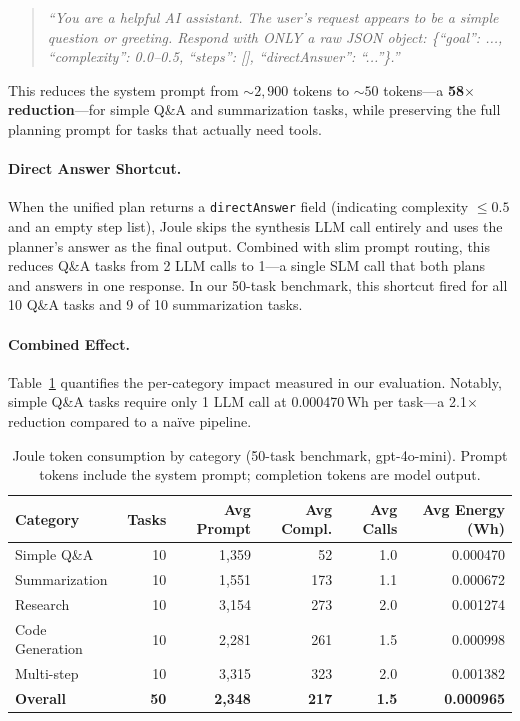 \begin{quote}
\small
\textit{``You are a helpful AI assistant. The user's request appears to be a simple question or greeting. Respond with ONLY a raw JSON object: \{``goal'': ..., ``complexity'': 0.0--0.5, ``steps'': [], ``directAnswer'': ``...''\}.''}
\end{quote}

\noindent This reduces the system prompt from ${\sim}2{,}900$ tokens to ${\sim}50$ tokens---a \textbf{58$\times$ reduction}---for simple Q\&A and summarization tasks, while preserving the full planning prompt for tasks that actually need tools.

\paragraph{Direct Answer Shortcut.}
When the unified plan returns a \texttt{directAnswer} field (indicating complexity $\leq 0.5$ and an empty step list), Joule skips the synthesis LLM call entirely and uses the planner's answer as the final output. Combined with slim prompt routing, this reduces Q\&A tasks from 2 LLM calls to 1---a single SLM call that both plans and answers in one response. In our 50-task benchmark, this shortcut fired for all 10 Q\&A tasks and 9 of 10 summarization tasks.

\paragraph{Combined Effect.}
Table~\ref{tab:prompt-savings} quantifies the per-category impact measured in our evaluation. Notably, simple Q\&A tasks require only 1 LLM call at 0.000470\,Wh per task---a 2.1$\times$ reduction compared to a na\"ive pipeline.

\begin{table}[h]
\centering
\caption{Joule token consumption by category (50-task benchmark, gpt-4o-mini). Prompt tokens include the system prompt; completion tokens are model output.}
\label{tab:prompt-savings}
\begin{tabular}{lrrrrr}
\toprule
Category & Tasks & Avg Prompt & Avg Compl. & Avg Calls & Avg Energy (Wh) \\
\midrule
Simple Q\&A      & 10 & 1{,}359 &  52 & 1.0 & 0.000470 \\
Summarization    & 10 & 1{,}551 & 173 & 1.1 & 0.000672 \\
Research         & 10 & 3{,}154 & 273 & 2.0 & 0.001274 \\
Code Generation  & 10 & 2{,}281 & 261 & 1.5 & 0.000998 \\
Multi-step       & 10 & 3{,}315 & 323 & 2.0 & 0.001382 \\
\midrule
\textbf{Overall} & \textbf{50} & \textbf{2{,}348} & \textbf{217} & \textbf{1.5} & \textbf{0.000965} \\
\bottomrule
\end{tabular}
\end{table}

